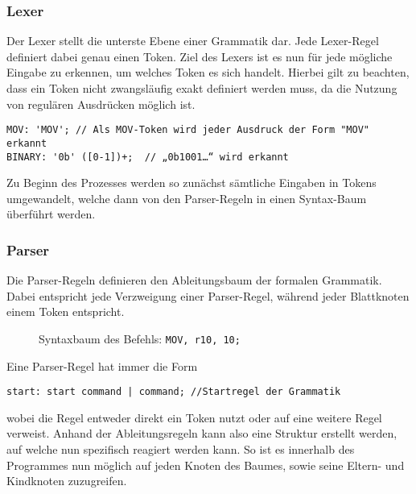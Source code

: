 \documentclass[paper=a4,fontsize=12pt,twocolumn]{scrreprt}
\begin{document}
\subsubsection{Lexer}
Der Lexer stellt die unterste Ebene einer Grammatik dar.
Jede Lexer-Regel definiert dabei genau einen Token.
Ziel des Lexers ist es nun für jede mögliche Eingabe zu erkennen, um welches Token es sich handelt.
Hierbei gilt zu beachten, dass ein Token nicht zwangsläufig exakt definiert werden muss, da die Nutzung von regulären Ausdrücken möglich ist.
\begin{lstlisting}
MOV: 'MOV'; // Als MOV-Token wird jeder Ausdruck der Form "MOV" erkannt
BINARY: '0b' ([0-1])+;  // „0b1001…“ wird erkannt
\end{lstlisting}
Zu Beginn des Prozesses werden so zunächst sämtliche Eingaben in Tokens umgewandelt, welche dann von den Parser-Regeln in einen Syntax-Baum überführt werden.

\subsubsection{Parser}
Die Parser-Regeln definieren den Ableitungsbaum der formalen Grammatik.
Dabei entspricht jede Verzweigung einer Parser-Regel, während jeder Blattknoten einem Token entspricht.

\begin{figure}[h]
\centering
\caption{Syntaxbaum des Befehls: \texttt{MOV, r10, 10;}}
\end{figure}

Eine Parser-Regel hat immer die Form
\begin{lstlisting}
start: start command | command; //Startregel der Grammatik
\end{lstlisting}
wobei die Regel entweder direkt ein Token nutzt oder auf eine weitere Regel verweist.
Anhand der Ableitungsregeln kann also eine Struktur erstellt werden, auf welche nun spezifisch reagiert werden kann.
So ist es innerhalb des Programmes nun möglich auf jeden Knoten des Baumes, sowie seine Eltern- und Kindknoten zuzugreifen.
\end{document}
